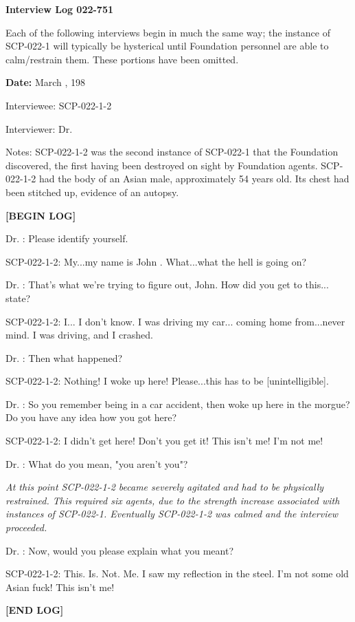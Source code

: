 \textbf{Interview Log 022-751}

Each of the following interviews begin in much the same way; the instance of SCP-022-1 will typically be hysterical until Foundation personnel are able to calm/restrain them. These portions have been omitted.

\textbf{Date:} March , 198

Interviewee: SCP-022-1-2

Interviewer: Dr. 

Notes: SCP-022-1-2 was the second instance of SCP-022-1 that the Foundation discovered, the first having been destroyed on sight by Foundation agents. SCP-022-1-2 had the body of an Asian male, approximately 54 years old. Its chest had been stitched up, evidence of an autopsy.

\begin{leftbar}
\begin{flushleft}
\textbf{[BEGIN LOG]}

Dr. : Please identify yourself.

SCP-022-1-2: My...my name is John . What...what the hell is going on?

Dr. : That's what we're trying to figure out, John. How did you get to this... state?

SCP-022-1-2: I... I don't know. I was driving my car... coming home from...never mind. I was driving, and I crashed.

Dr. : Then what happened?

SCP-022-1-2: Nothing! I woke up here! Please...this has to be [unintelligible].

Dr. : So you remember being in a car accident, then woke up here in the morgue? Do you have any idea how you got here?

SCP-022-1-2: I didn't get here! Don't you get it! This isn't me! I'm not me!

Dr. : What do you mean, "you aren't you"?

\textsl{At this point SCP-022-1-2 became severely agitated and had to be physically restrained. This required six agents, due to the strength increase associated with instances of SCP-022-1. Eventually SCP-022-1-2 was calmed and the interview proceeded.}

Dr. : Now, would you please explain what you meant?

SCP-022-1-2: This. Is. Not. Me. I saw my reflection in the steel. I'm not some old Asian fuck! This isn't me!

\textbf{[END LOG]}
\end{flushleft}
\end{leftbar}

